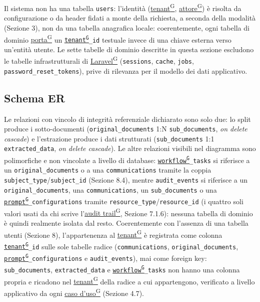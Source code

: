 \documentclass[a4paper,12pt]{article}
\providecommand{\glslink}[2]{\href{https://alittlebyte-19.github.io/Documentazione/glossario.html\#gls-#1}{\underline{#2}\textsuperscript{\scriptsize G}}}
\begin{document}
\begin{sloppypar}

Il sistema non ha una tabella \texttt{users}: l'identità (\glslink{tenant}{tenant}, \glslink{attore}{attore}) è risolta da configurazione o da header fidati a monte della richiesta, a seconda della modalità (Sezione 3), non da una tabella anagrafica locale: coerentemente, ogni tabella di dominio \glslink{porta}{porta} un \texttt{\glslink{tenant}{tenant}\_id} testuale invece di una chiave esterna verso un'entità utente. Le sette tabelle di dominio descritte in questa sezione escludono le tabelle infrastrutturali di \glslink{laravel}{Laravel} (\texttt{sessions}, \texttt{cache}, \texttt{jobs}, \texttt{password\_reset\_tokens}), prive di rilevanza per il modello dei dati applicativo.

\subsection{Schema ER}

Le relazioni con vincolo di integrità referenziale dichiarato sono solo due: lo split produce i sotto-documenti (\texttt{original\_documents} 1:N \texttt{sub\_documents}, \textit{on delete cascade}) e l'estrazione produce i dati strutturati (\texttt{sub\_documents} 1:1 \texttt{extracted\_data}, \textit{on delete cascade}). Le altre relazioni visibili nel diagramma sono polimorfiche e non vincolate a livello di database: \texttt{\glslink{workflow}{workflow}\_tasks} si riferisce a un \texttt{original\_documents} o a una \texttt{communications} tramite la coppia \texttt{subject\_type}/\texttt{subject\_id} (Sezione 8.4), mentre \texttt{audit\_events} si riferisce a un \texttt{original\_documents}, una \texttt{communications}, un \texttt{sub\_documents} o una \texttt{\glslink{prompt}{prompt}\_configurations} tramite \texttt{resource\_type}/\texttt{resource\_id} (i quattro soli valori usati da chi scrive l'\glslink{audit-trail}{audit trail}, Sezione 7.1.6): nessuna tabella di dominio è quindi realmente isolata dal resto. Coerentemente con l'assenza di una tabella utenti (Sezione 8), l'appartenenza al \glslink{tenant}{tenant} è registrata come colonna \texttt{\glslink{tenant}{tenant}\_id} sulle sole tabelle radice (\texttt{communications}, \texttt{original\_documents}, \texttt{\glslink{prompt}{prompt}\_configurations} e \texttt{audit\_events}), mai come foreign key: \texttt{sub\_documents}, \texttt{extracted\_data} e \texttt{\glslink{workflow}{workflow}\_tasks} non hanno una colonna propria e ricadono nel \glslink{tenant}{tenant} della radice a cui appartengono, verificato a livello applicativo da ogni \glslink{caso-d-uso-uc}{caso d'uso} (Sezione 4.7).


\end{sloppypar}
\end{document}
